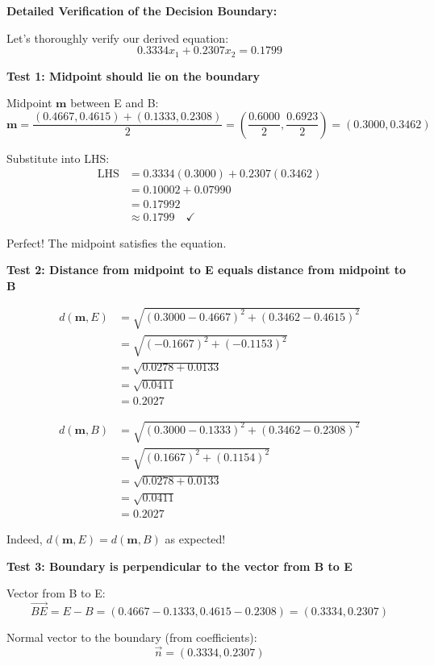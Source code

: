 \documentclass[12pt]{article}
\begin{document}
\begin{computation}
\textbf{Detailed Verification of the Decision Boundary:}

Let's thoroughly verify our derived equation:
\[
0.3334 x_1 + 0.2307 x_2 = 0.1799
\]

\textbf{Test 1: Midpoint should lie on the boundary}

Midpoint \(\mathbf{m}\) between E and B:
\[
\mathbf{m} = \frac{(0.4667, 0.4615) + (0.1333, 0.2308)}{2} = \left(\frac{0.6000}{2}, \frac{0.6923}{2}\right) = (0.3000, 0.3462)
\]

Substitute into LHS:
\begin{align*}
\text{LHS} &= 0.3334(0.3000) + 0.2307(0.3462) \\
&= 0.10002 + 0.07990 \\
&= 0.17992 \\
&\approx 0.1799 \quad \checkmark
\end{align*}

Perfect! The midpoint satisfies the equation.

\textbf{Test 2: Distance from midpoint to E equals distance from midpoint to B}

\begin{align*}
d(\mathbf{m}, E) &= \sqrt{(0.3000 - 0.4667)^2 + (0.3462 - 0.4615)^2} \\
&= \sqrt{(-0.1667)^2 + (-0.1153)^2} \\
&= \sqrt{0.0278 + 0.0133} \\
&= \sqrt{0.0411} \\
&= 0.2027
\end{align*}

\begin{align*}
d(\mathbf{m}, B) &= \sqrt{(0.3000 - 0.1333)^2 + (0.3462 - 0.2308)^2} \\
&= \sqrt{(0.1667)^2 + (0.1154)^2} \\
&= \sqrt{0.0278 + 0.0133} \\
&= \sqrt{0.0411} \\
&= 0.2027
\end{align*}

Indeed, \(d(\mathbf{m}, E) = d(\mathbf{m}, B)\) as expected! \checkmark

\textbf{Test 3: Boundary is perpendicular to the vector from B to E}

Vector from B to E:
\[
\vec{BE} = E - B = (0.4667 - 0.1333, 0.4615 - 0.2308) = (0.3334, 0.2307)
\]

Normal vector to the boundary (from coefficients):
\[
\vec{n} = (0.3334, 0.2307)
\]


\end{computation}
\end{document}
